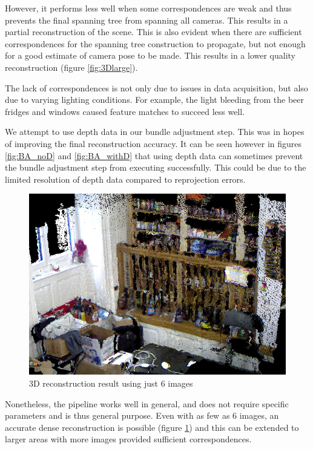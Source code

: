 \documentclass[10pt,twocolumn,letterpaper]{article}
\begin{document}
However, it performs less well when some correspondences are weak and thus
prevents the final spanning tree from spanning all cameras. This results in a
partial reconstruction of the scene. This is also evident when there are
sufficient correspondences for the spanning tree construction to propagate,
but not enough for a good estimate of camera pose to be made. This results in a
lower quality reconstruction (figure \ref{fig:3Dlarge}).

The lack of correspondences is not only due to issues in data acquisition, but
also due to varying lighting conditions. For example, the light bleeding from
the beer fridges and windows caused feature matches to succeed less well.

We attempt to use depth data in our bundle adjustment step. This was in hopes of
improving the final reconstruction accuracy. It can be seen however in figures
\ref{fig:BA_noD} and \ref{fig:BA_withD} that using depth data can sometimes
prevent the bundle adjustment step from executing successfully. This could be
due to the limited resolution of depth data compared to reprojection errors.

\begin{figure}
\begin{center}
   \includegraphics[width=0.9\linewidth]{figures/result_tiny_noBA.png}
\end{center}
\caption{3D reconstruction result using just 6 images}
\label{fig:3D_6images}
\end{figure}

Nonetheless, the pipeline works well in general, and does not require specific
parameters and is thus general purpose. Even with as few as 6 images, an
accurate dense reconstruction is possible (figure \ref{fig:3D_6images}) and this
can be extended to larger areas with more images provided sufficient
correspondences.
\end{document}
